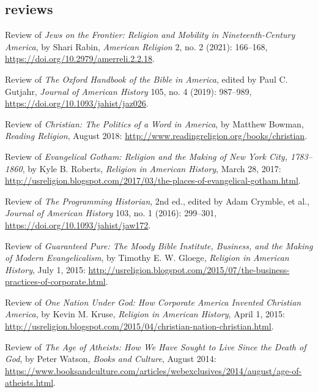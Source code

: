 \documentclass[11pt]{article}
\begin{document}
\subsection{reviews}\label{book-reviews}

Review of \emph{Jews on the Frontier: Religion and Mobility in Nineteenth-Century America}, by Shari Rabin, \emph{American Religion} 2, no. 2 (2021): 166--168, \url{https://doi.org/10.2979/amerreli.2.2.18}.

Review of \emph{The Oxford Handbook of the Bible in America}, edited by Paul 
C. Gutjahr, \emph{Journal of American History} 105, no. 4 (2019): 987--989, \url{https://doi.org/10.1093/jahist/jaz026}.

Review of \emph{Christian: The Politics of a Word in America}, by Matthew 
Bowman, \emph{Reading Religion}, August 2018: 
\url{http://www.readingreligion.org/books/christian}.

Review of \emph{Evangelical Gotham: Religion and the Making of New York City, 
  1783--1860}, by Kyle B. Roberts, \emph{Religion in American History}, March 
28, 2017: 
\url{http://usreligion.blogspot.com/2017/03/the-places-of-evangelical-gotham.html}.

Review of \emph{The Programming Historian}, 2nd ed., edited by
Adam Crymble, et al., \emph{Journal of American History} 103, no. 1 (2016): 
299--301, \url{https://doi.org/10.1093/jahist/jaw172}.

Review of \emph{Guaranteed Pure: The Moody Bible Institute, Business, and the 
  Making of Modern Evangelicalism}, by Timothy E. W. Gloege, \emph{Religion in 
  American History}, July 1, 2015: 
  \url{http://usreligion.blogspot.com/2015/07/the-business-practices-of-corporate.html}.

Review of \emph{One Nation Under God: How Corporate America Invented Christian 
  America}, by Kevin M. Kruse, \emph{Religion in American History}, April 1, 
2015: 
\url{http://usreligion.blogspot.com/2015/04/christian-nation-christian.html}.


Review of \emph{The Age of Atheists: How We Have Sought to Live Since
  the Death of God}, by Peter Watson, \emph{Books and Culture}, August
2014: 
\url{https://www.booksandculture.com/articles/webexclusives/2014/august/age-of-atheists.html}.
\end{document}
